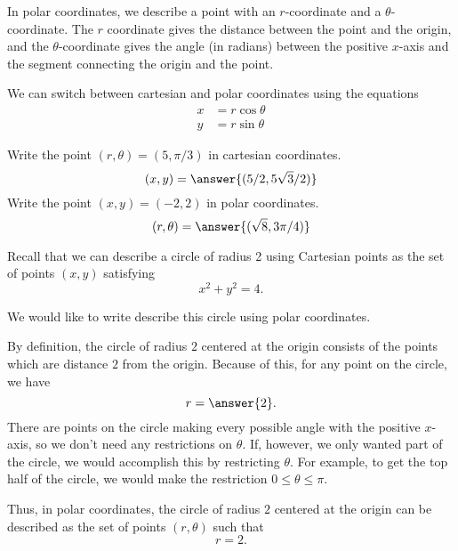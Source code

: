 \documentclass{ximera}
\begin{document}
In polar coordinates, we describe a point with an $r$-coordinate and a $\theta$-coordinate. The $r$ coordinate gives the distance between the point and the origin, and the $\theta$-coordinate gives the angle (in radians) between the positive $x$-axis and the segment connecting the origin and the point.

We can switch between cartesian and polar coordinates using the equations
\begin{align*}
x&=r\cos\theta\\
y&=r\sin\theta
\end{align*}

\begin{image}
\end{image}

\begin{problem}
Write the point $(r,\theta) = (5, \pi/3)$ in cartesian coordinates.
\[
(x,y) = \answer{(5/2, 5\sqrt{3}/2)}
\]
Write the point $(x,y) = (-2,2)$ in polar coordinates.
\[
(r,\theta) = \answer{(\sqrt{8}, 3\pi/4)}
\]
\end{problem}

\begin{example}
Recall that we can describe a circle of radius 2 using Cartesian points as the set of points $(x,y)$ satisfying
\[
x^2+y^2 = 4.
\]

\begin{image}
\end{image}

We would like to write describe this circle using polar coordinates.

By definition, the circle of radius $2$ centered at the origin consists of the points which are distance $2$ from the origin. Because of this, for any point on the circle, we have
\[
r = \answer{2}.
\]
There are points on the circle making every possible angle with the positive $x$-axis, so we don't need any restrictions on $\theta$. If, however, we only wanted part of the circle, we would accomplish this by restricting $\theta$. For example, to get the top half of the circle, we would make the restriction $0\leq \theta \leq \pi$.

Thus, in polar coordinates, the circle of radius $2$ centered at the origin can be described as the set of points $(r,\theta)$ such that
\[
r = 2.
\]
\end{example}
\end{document}
